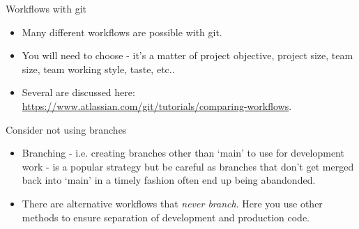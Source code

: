 \documentclass[usenames,dvipsnames]{beamer}
\begin{document}
\begin{frame}{Workflows with git}
  \begin{block}{}
    \begin{itemize}
      \item{Many different workflows are possible with git.}
      \item{You will need to choose - it's a matter of project objective, project size, team size, team working style, taste, etc..}
      \item{Several are discussed here: \url{https://www.atlassian.com/git/tutorials/comparing-workflows}.}
    \end{itemize}
  \end{block}
\end{frame}

\begin{frame}{Consider not using branches}
  \begin{block}{}
    \begin{itemize}
      \item{Branching - i.e. creating branches other than `main' to use for development work - is a popular strategy but be careful as branches that don't get merged back into `main' in a timely fashion often end up being abandonded.}
      \item{There are alternative workflows that \textit{never branch}. Here you use other methods to ensure separation of development and production code.}

    \end{itemize}
  \end{block}
\end{frame}
\end{document}
